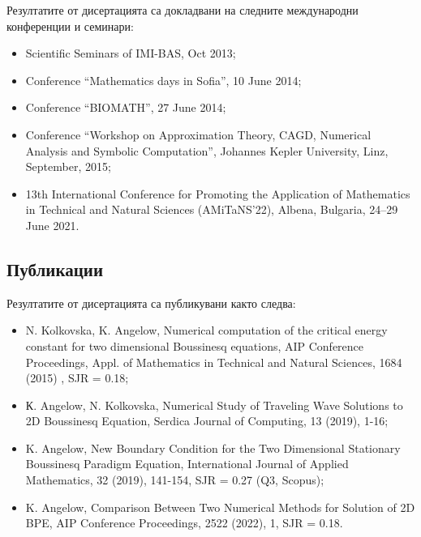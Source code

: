 \documentclass[a4paper]{article}
\theoremstyle{remark}
\begin{document}
\begin{large}
Резултатите от дисертацията са докладвани на следните международни конференции и семинари:
\begin{itemize}
\item Scientific Seminars of IMI-BAS, Oct 2013;

\item Conference ``Mathematics days in Sofia'', 10 June 2014;

\item Conference ``BIOMATH'', 27 June 2014;

\item Conference ``Workshop on Approximation Theory, CAGD, Numerical Analysis and Symbolic Computation'',  Johannes Kepler University, Linz, September, 2015;

\item 13th International Conference for Promoting the Application of Mathematics in Technical and Natural Sciences (AMiTaNS’22), Albena, Bulgaria, 24–29 June 2021. 
\end{itemize}

\subsection{Публикации}\label{approb}

Резултатите от дисертацията са публикувани както следва:
\begin{itemize}
\item N. Kolkovska, K. Angelow, Numerical computation of the critical energy constant for two dimensional Boussinesq equations, AIP Conference Proceedings, Appl. of Mathematics in Technical and Natural Sciences, 1684 (2015) , SJR = 0.18;

\item К. Angelow, N. Kolkovska, Numerical Study of Traveling Wave Solutions to 2D Boussinesq Equation, Serdica Journal of Computing, 13 (2019), 1-16;

\item K. Angelow, New Boundary Condition for the Two Dimensional Stationary Boussinesq Paradigm Equation, International Journal of Applied Mathematics, 32 (2019), 141-154, SJR = 0.27 (Q3, Scopus);

\item K. Angelow, Comparison Between Two Numerical Methods for Solution of 2D BPE, AIP Conference Proceedings, 2522 (2022), 1, SJR = 0.18.
\end{itemize}

\newpage

\end{large}
\end{document}
